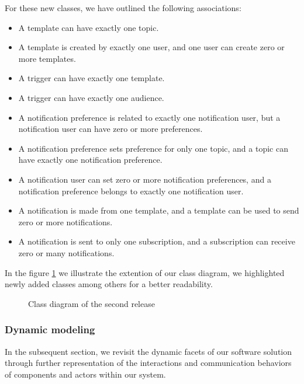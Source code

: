 \noindent For these new classes, we have outlined the following associations:

\begin{itemize}
    \item A template can have exactly one topic.
    \item A template is created by exactly one user, and one user can create zero or more templates.
    \item A trigger can have exactly one template.
    \item A trigger can have exactly one audience.
    \item A notification preference is related to exactly one notification user,
          but a notification user can have zero or more preferences.
    \item A notification preference sets preference for only one topic, and a topic can have exactly one notification preference.
    \item A notification user can set zero or more notification preferences, and a notification preference
          belongs to exactly one notification user.
    \item A notification is made from one template, and a template can be used to send zero or more notifications.
    \item A notification is sent to only one subscription, and a subscription can receive zero or many notifications.
\end{itemize}

\noindent In the figure \ref{r2-class} we illustrate the extention of our class diagram, we highlighted
newly added classes among others for a better readability.

\begin{landscape}
    \begin{figure}[hbt!]
        \centering
        
        \caption{Class diagram of the second release}
        \label{r2-class}
    \end{figure}
\end{landscape}

\subsubsection{Dynamic modeling}
In the subsequent section, we revisit the dynamic facets of our software solution through further
representation of the interactions and communication behaviors of components and actors within our system.

